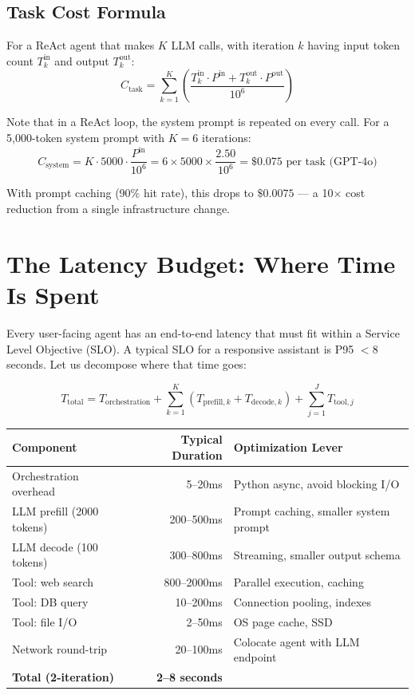 \subsection{Task Cost Formula}
For a ReAct agent that makes $K$ LLM calls, with iteration $k$ having input token count $T_k^{\text{in}}$ and output $T_k^{\text{out}}$:
\begin{equation}
C_{\text{task}} = \sum_{k=1}^{K} \left( \frac{T_k^{\text{in}} \cdot P^{\text{in}} + T_k^{\text{out}} \cdot P^{\text{out}}}{10^6} \right)
\end{equation}

Note that in a ReAct loop, the system prompt is repeated on every call. For a 5,000-token system prompt with $K=6$ iterations:
\begin{equation}
C_{\text{system}} = K \cdot 5000 \cdot \frac{P^{\text{in}}}{10^6} = 6 \times 5000 \times \frac{2.50}{10^6} = \$0.075 \text{ per task (GPT-4o)}
\end{equation}

With prompt caching (90\% hit rate), this drops to $\$0.0075$ — a 10$\times$ cost reduction from a single infrastructure change.

\section{The Latency Budget: Where Time Is Spent}

Every user-facing agent has an end-to-end latency that must fit within a Service Level Objective (SLO). A typical SLO for a responsive assistant is P95 $< 8$ seconds. Let us decompose where that time goes:

\begin{equation}
T_{\text{total}} = T_{\text{orchestration}} + \sum_{k=1}^{K} (T_{\text{prefill},k} + T_{\text{decode},k}) + \sum_{j=1}^{J} T_{\text{tool},j}
\end{equation}

\begin{center}
\begin{tabular}{|l|r|l|}
\hline
\textbf{Component} & \textbf{Typical Duration} & \textbf{Optimization Lever} \\
\hline
Orchestration overhead & 5--20ms & Python async, avoid blocking I/O \\
LLM prefill (2000 tokens) & 200--500ms & Prompt caching, smaller system prompt \\
LLM decode (100 tokens) & 300--800ms & Streaming, smaller output schema \\
Tool: web search & 800--2000ms & Parallel execution, caching \\
Tool: DB query & 10--200ms & Connection pooling, indexes \\
Tool: file I/O & 2--50ms & OS page cache, SSD \\
Network round-trip & 20--100ms & Colocate agent with LLM endpoint \\
\hline
\textbf{Total (2-iteration)} & \textbf{2--8 seconds} & \\
\hline
\end{tabular}
\end{center}

